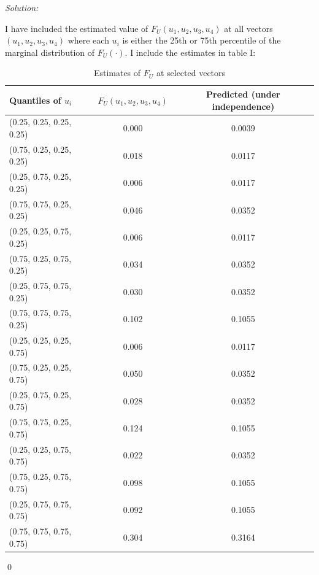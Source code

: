 \documentclass[12pt]{article}
\newenvironment{sol}
    {\emph{Solution:}
    }
    {
    \qed
    }
\begin{document}
\begin{sol}
    I have included the estimated value of $F_U(u_1, u_2, u_3, u_4)$ at all vectors $(u_1, u_2, u_3, u_4)$ where each $u_i$ is either the 25th or 75th percentile of the marginal distribution of $F_U(\cdot)$. I include the estimates in table I:
    \begin{center}
        \begin{table}[!htbp]
            \centering
            \caption{Estimates of $F_U$ at selected vectors}
              \begin{tabular}{lcc}
                  \toprule
                    Quantiles of $u_i$                & $F_U(u_1, u_2, u_3, u_4)      $     & Predicted (under independence)            \\
                  \midrule
                    (0.25, 0.25, 0.25, 0.25) & 0.000 & 0.0039\\
                    (0.75, 0.25, 0.25, 0.25) & 0.018 & 0.0117\\
                    (0.25, 0.75, 0.25, 0.25) & 0.006 & 0.0117\\
                    (0.75, 0.75, 0.25, 0.25) & 0.046 & 0.0352\\
                    (0.25, 0.25, 0.75, 0.25) & 0.006 & 0.0117\\
                    (0.75, 0.25, 0.75, 0.25) & 0.034 & 0.0352\\
                    (0.25, 0.75, 0.75, 0.25) & 0.030 & 0.0352\\
                    (0.75, 0.75, 0.75, 0.25) & 0.102 & 0.1055\\
                    (0.25, 0.25, 0.25, 0.75) & 0.006 & 0.0117\\
                    (0.75, 0.25, 0.25, 0.75) & 0.050 & 0.0352\\
                    (0.25, 0.75, 0.25, 0.75) & 0.028 & 0.0352\\
                    (0.75, 0.75, 0.25, 0.75) & 0.124 & 0.1055\\
                    (0.25, 0.25, 0.75, 0.75) & 0.022 & 0.0352\\
                    (0.75, 0.25, 0.75, 0.75) & 0.098 & 0.1055\\
                    (0.25, 0.75, 0.75, 0.75) & 0.092 & 0.1055\\
                    (0.75, 0.75, 0.75, 0.75) & 0.304 & 0.3164\\
                  \bottomrule
              \end{tabular}
            \label{tab:FU_computation}
          \end{table}
    \end{center} 
\end{sol}
\end{document}
